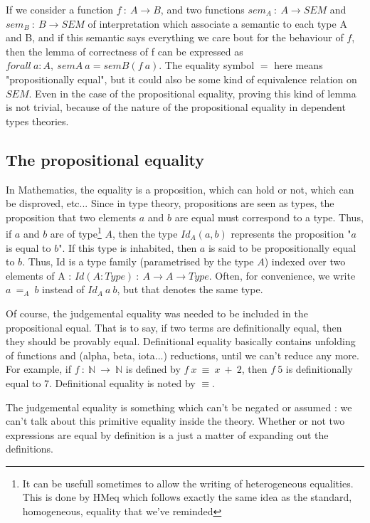 \documentclass{jfp1}
\begin{document}
If we consider a function $f\ :\ A \rightarrow B$, and two functions $sem_A\ :\ A \rightarrow SEM$ and $sem_B\ : \ B \rightarrow SEM$ of interpretation which associate a semantic to each type A and B, and if this semantic says everything we care bout for the behaviour of $f$, then the lemma of correctness of f can be expressed as $forall\ a:A,\ semA\ a = semB (f\ a)$.
The equality symbol $=$ here means "propositionally equal", but it could also be some kind of equivalence relation on $SEM$. Even in the case of the propositional equality, proving this kind of lemma is not trivial, because of the nature of the propositional equality in dependent types theories.

\subsection{The propositional equality}
In Mathematics, the equality is a proposition, which can hold or not, which can be disproved, etc...
Since in type theory, propositions are seen as types, the proposition that two elements $a$ and $b$ are equal must correspond to a type. Thus, if $a$ and $b$ are of type\footnote{It can be usefull sometimes to allow the writing of heterogeneous equalities. This is done by HMeq which follows exactly the same idea as the standard, homogeneous, equality that we've reminded} $A$, then the type $Id_A(a, b)$ represents the proposition "$a$ is equal to $b$". If this type is inhabited, then $a$ is said to be propositionally equal to $b$.
Thus, Id is a type family (parametrised by the type $A$) indexed over two elements of A : $Id (A:Type)\ :\ A \rightarrow A \rightarrow Type$. Often, for convenience, we write $a\ =_A\ b$ instead of $Id_A\ a\ b$, but that denotes the same type.

Of course, the judgemental equality was needed to be included in the propositional equal. That is to say, if two terms are definitionally equal, then they should be provably equal.
Definitional equality basically contains unfolding of functions and (alpha, beta, iota...) reductions, until we can't reduce any more.
For example, if $f\ :\ \mathbb{N}\ \rightarrow\ \mathbb{N}$ is defined by $f\ x\ \equiv\ x\ +\ 2$, then $f\ 5$ is definitionally equal to $7$.
Definitional equality is noted by $\equiv$.

The judgemental equality is something which can't be negated or assumed : we can't talk about this primitive equality inside the theory. Whether or not two expressions are equal by definition is a just a matter of expanding out the definitions.
\end{document}

